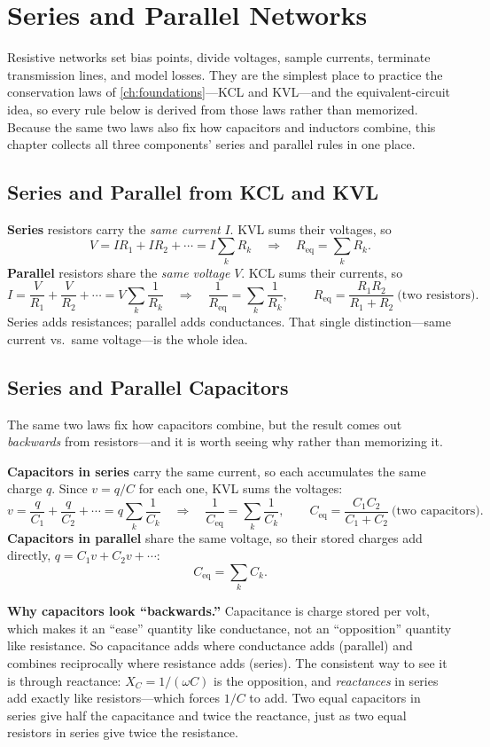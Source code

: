\chapter{Series and Parallel Networks}
\label{ch:resistive}
Resistive networks set bias points, divide voltages, sample currents, terminate
transmission lines, and model losses. They are the simplest place to practice the
conservation laws of \cref{ch:foundations}---KCL and KVL---and the
equivalent-circuit idea, so every rule below is derived from those laws rather than
memorized. Because the same two laws also fix how capacitors and inductors combine,
this chapter collects all three components' series and parallel rules in one place.

\section{Series and Parallel from KCL and KVL}
\textbf{Series} resistors carry the \emph{same current} \(I\). KVL sums their
voltages, so
\[
V=IR_1+IR_2+\cdots=I\sum_k R_k
\quad\Longrightarrow\quad
R_{\mathrm{eq}}=\sum_k R_k .
\]
\textbf{Parallel} resistors share the \emph{same voltage} \(V\). KCL sums their
currents, so
\[
I=\frac{V}{R_1}+\frac{V}{R_2}+\cdots=V\sum_k\frac{1}{R_k}
\quad\Longrightarrow\quad
\frac{1}{R_{\mathrm{eq}}}=\sum_k\frac{1}{R_k},
\qquad
R_{\mathrm{eq}}=\frac{R_1R_2}{R_1+R_2}\ \text{(two resistors)}.
\]
Series adds resistances; parallel adds conductances. That single distinction---same
current vs.\ same voltage---is the whole idea.

\section{Series and Parallel Capacitors}
The same two laws fix how capacitors combine, but the result comes out
\emph{backwards} from resistors---and it is worth seeing why rather than
memorizing it.

\textbf{Capacitors in series} carry the same current, so each accumulates the same
charge \(q\). Since \(v=q/C\) for each one, KVL sums the voltages:
\[
v=\frac{q}{C_1}+\frac{q}{C_2}+\cdots=q\sum_k\frac{1}{C_k}
\quad\Longrightarrow\quad
\frac{1}{C_{\mathrm{eq}}}=\sum_k\frac{1}{C_k},
\qquad
C_{\mathrm{eq}}=\frac{C_1C_2}{C_1+C_2}\ \text{(two capacitors)}.
\]
\textbf{Capacitors in parallel} share the same voltage, so their stored charges add
directly, \(q=C_1v+C_2v+\cdots\):
\[
C_{\mathrm{eq}}=\sum_k C_k .
\]

\begin{physicalbox}
\textbf{Why capacitors look ``backwards.''} Capacitance is charge stored per volt,
which makes it an ``ease'' quantity like conductance, not an ``opposition'' quantity
like resistance. So capacitance adds where conductance adds (parallel) and combines
reciprocally where resistance adds (series). The consistent way to see it is through
reactance: \(X_C=1/(\omega C)\) is the opposition, and \emph{reactances} in series
add exactly like resistors---which forces \(1/C\) to add. Two equal capacitors in
series give half the capacitance and twice the reactance, just as two equal
resistors in series give twice the resistance.
\end{physicalbox}

